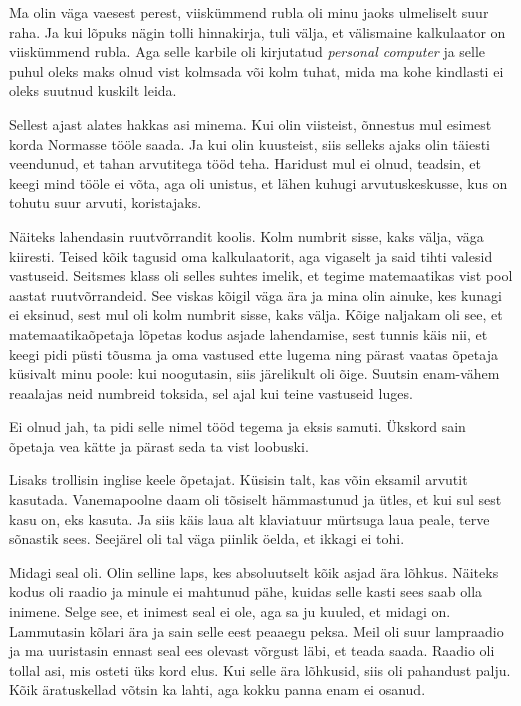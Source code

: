 
Ma olin väga vaesest perest, viiskümmend rubla oli minu jaoks 
ulmeliselt suur raha. Ja kui lõpuks nägin tolli hinnakirja, tuli välja, et 
välismaine kalkulaator on viiskümmend rubla. Aga selle karbile oli kirjutatud 
\emph{personal computer} ja selle puhul oleks maks olnud vist 
kolmsada või kolm tuhat, mida ma kohe 
kindlasti ei oleks suutnud kuskilt leida. 

Sellest ajast alates hakkas asi minema. Kui olin viisteist, õnnestus mul esimest 
korda Normasse tööle saada. Ja kui olin kuusteist, siis selleks ajaks 
olin täiesti veendunud, et tahan arvutitega tööd teha. Haridust mul ei 
olnud, teadsin, et keegi mind tööle ei võta, aga oli unistus, et 
lähen kuhugi arvutuskeskusse, kus on tohutu suur arvuti, koristajaks.


Näiteks lahendasin ruutvõrrandit koolis. Kolm numbrit sisse, kaks välja, 
väga kiiresti. Teised kõik tagusid oma kalkulaatorit, aga vigaselt ja said tihti 
valesid vastuseid. Seitsmes klass oli selles suhtes imelik, et
tegime matemaatikas vist pool aastat ruutvõrrandeid. See viskas kõigil
väga ära ja mina olin ainuke, kes kunagi ei eksinud, sest mul oli 
kolm numbrit sisse, kaks välja. Kõige naljakam oli see, et 
matemaatikaõpetaja lõpetas kodus asjade lahendamise, sest tunnis käis 
nii, et keegi pidi püsti tõusma ja oma vastused ette lugema ning 
pärast vaatas õpetaja küsivalt minu poole: kui noogutasin, 
siis järelikult oli õige. Suutsin enam-vähem reaalajas neid numbreid 
toksida, sel ajal kui teine vastuseid luges. 


Ei olnud jah, ta pidi selle nimel tööd tegema ja eksis samuti. Ükskord sain õpetaja vea kätte ja pärast seda ta vist 
loobuski. 

Lisaks trollisin inglise keele õpetajat. Küsisin talt, kas võin eksamil arvutit kasutada. 
Vanemapoolne daam oli tõsiselt hämmastunud ja ütles, et kui 
sul sest kasu on, eks kasuta. Ja siis käis laua alt klaviatuur mürtsuga laua 
peale, terve sõnastik sees. Seejärel oli tal väga piinlik öelda, et ikkagi ei tohi. 


Midagi seal oli. Olin
selline laps, kes absoluutselt kõik asjad ära lõhkus. Näiteks kodus oli raadio 
ja minule ei mahtunud pähe, kuidas selle kasti sees saab olla inimene. 
Selge see, et inimest seal ei ole, aga sa ju kuuled, et midagi on. Lammutasin kõlari ära ja sain selle eest 
peaaegu peksa. Meil oli suur lampraadio ja ma uuristasin 
ennast seal ees olevast võrgust läbi, et teada saada. Raadio oli tollal asi, 
mis osteti üks kord elus. Kui selle ära lõhkusid, siis oli pahandust
palju. Kõik äratuskellad võtsin ka lahti, aga kokku panna enam ei osanud.


